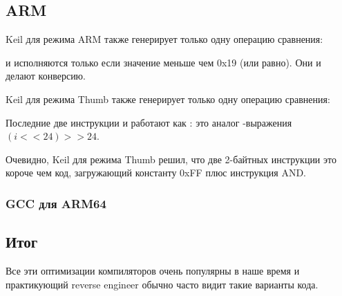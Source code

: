 \subsection{ARM}

\Optimizing Keil для режима ARM также генерирует только одну операцию сравнения:




 и  исполняются только если значение  меньше чем 0x19 (или равно).
Они и делают конверсию.

\Optimizing Keil для режима Thumb также генерирует только одну операцию сравнения:




Последние две инструкции  и  работают как :
это аналог \CCpp-выражения $(i<<24)>>24$.

Очевидно, Keil для режима Thumb решил, что две 2-байтных инструкции это короче чем код, загружающий
константу 0xFF плюс инструкция AND.

\subsubsection{GCC для ARM64}





\subsection{Итог}

Все эти оптимизации компиляторов очень популярны в наше время и практикующий
reverse engineer обычно часто видит такие варианты кода.
